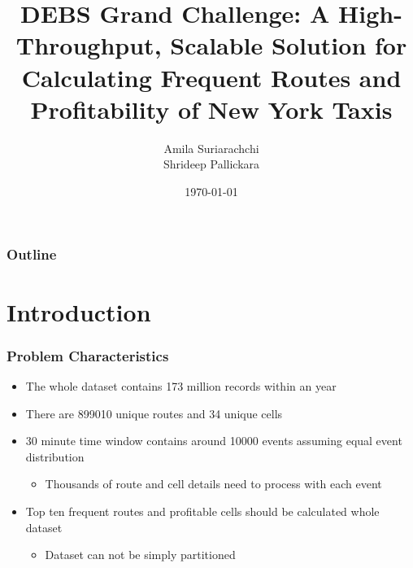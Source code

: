 \documentclass{beamer}
\title[Grand Challenge 2015]{DEBS Grand Challenge: A High-Throughput, Scalable Solution for Calculating Frequent Routes and Profitability of New York Taxis} %
\author[Amila Suriarachchi]{Amila Suriarachchi \\ Shrideep Pallickara } %
\institute[CSU] %
{
Colorado State University \\ %
\medskip
\textit{amilas@cs.colostate.edu} %
\medskip
}
\date{\today} %
\begin{document}
\begin{frame}
\titlepage %
\end{frame}

\begin{frame}
\frametitle{Outline} %
\tableofcontents %
\end{frame}


\section{Introduction} %

\begin{frame}
\frametitle{Problem Characteristics}
\begin{itemize}
	\item The whole dataset contains 173 million records within an year
	\item There are 899010 unique routes and 34 unique cells
	\item 30 minute time window contains around 10000 events assuming equal event distribution
		\begin{itemize}
			\item Thousands of route and cell details need to process with each event
		\end{itemize}
	\item Top ten frequent routes and profitable cells should be calculated whole dataset
		\begin{itemize}
                        \item Dataset can not be simply partitioned 
                \end{itemize}
\end{itemize}

\end{frame}
\end{document}
